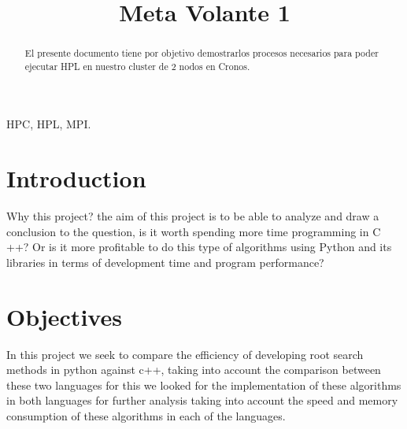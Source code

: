 \documentclass[conference]{IEEEtran}
\begin{document}
\title{Meta Volante 1}

\author{
\and
{}
\and
{}
\and
{}
}

\maketitle

\begin{abstract}
El presente documento tiene por objetivo demostrarlos procesos necesarios para poder ejecutar HPL en
nuestro cluster de 2 nodos en Cronos. 
\end{abstract}

\begin{IEEEkeywords}
HPC, HPL, MPI.
\end{IEEEkeywords}

\section{Introduction}
Why this project? the aim of this project is to be able to analyze and draw a conclusion to 
the question, is it worth spending more time programming in C ++? Or is it more profitable to do 
this type of algorithms using Python and its libraries in terms of development time and program performance?

\section{Objectives}
In this project we seek to compare the efficiency of developing root search methods in python against c++, taking into account the comparison between these two languages for this we looked for the implementation of these algorithms in both languages for further analysis taking into account the speed and memory consumption of these algorithms in each of the languages.
\end{document}
